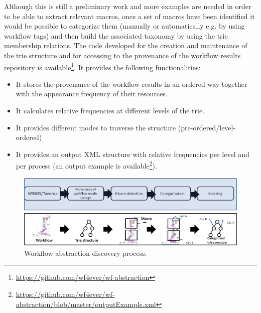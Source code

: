 Although this is still a preliminary work and more examples are needed in order to be able to extract relevant macros, once a set of macros have been identified it would be possible to categorize them (manually or automatically e.g. by using workflow tags) and then build the associated taxonomy by using the trie membership relations. The code developed for the creation and maintenance of the trie structure and for accessing to the provenance of the workflow results repository is available\footnote{\url{https://github.com/wf4ever/wf-abstraction}}. It provides the following functionalities:
\begin{itemize}
\item It stores the provenance of the workflow results in an ordered way together with the appearance frequency of their resources.
\item It calculates relative frequencies at different levels of the trie.
\item It provides different modes to traverse the structure (pre-ordered/level-ordered)
\item It provides an output XML structure with relative frequencies per level and per process (an output example is available\footnote{\url{https://github.com/wf4ever/wf-abstraction/blob/master/outputExample.xml}}).
\end{itemize}









\begin{figure}
\begin{center}
	\includegraphics[scale=0.65]{./Figures/workflowAbstraction}
		\caption{Workflow abstraction discovery process.}
		\label{fig:workflowAbstraction}
\end{center}
\end{figure}
